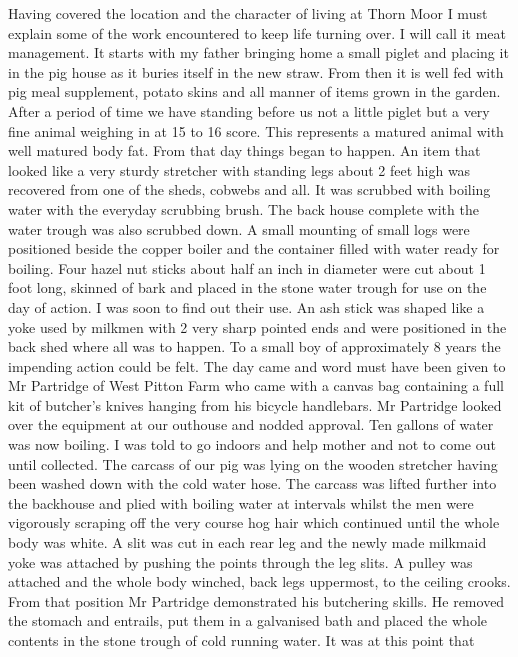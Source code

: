 
Having covered the location and the character of living at Thorn Moor I must
explain some of the work encountered to keep life turning over. I will call it
meat management. It starts with my father bringing home a small piglet and
placing it in the pig house as it buries itself in the new straw. From then it
is well fed with pig meal supplement, potato skins and all manner of items
grown in the garden. After a period of time we have standing before us not a
little piglet but a very fine animal weighing in at 15 to 16 score. This
represents a matured animal with well matured body fat. From that day things
began to happen. An item that looked like a very sturdy stretcher with
standing legs about 2 feet high was recovered from one of the sheds, cobwebs
and all. It was scrubbed with boiling water with the everyday scrubbing brush.
The back house complete with the water trough was also scrubbed down. A small
mounting of small logs were positioned beside the copper boiler and the
container filled with water ready for boiling. Four hazel nut sticks about
half an inch in diameter were cut about 1 foot long, skinned of bark and placed
in the stone water trough for use on the day of action. I was soon to find out
their use. An ash stick was shaped like a yoke used by milkmen with 2 very
sharp pointed ends and were positioned in the back shed where all was to
happen. To a small boy of approximately 8 years the impending action could be
felt. The day came and word must have been given to Mr Partridge of West Pitton
Farm who came with a canvas bag containing a full kit of butcher's knives
hanging from his bicycle handlebars. Mr Partridge looked over the equipment at
our outhouse and nodded approval. Ten gallons of water was now boiling. I was
told to go indoors and help mother and not to come out until collected. The
carcass of our pig was lying on the wooden stretcher having been washed down
with the cold water hose. The carcass was lifted further into the backhouse
and plied with boiling water at intervals whilst the men were vigorously
scraping off the very course hog hair which continued until the whole body was
white. A slit was cut in each rear leg and the newly made milkmaid yoke was
attached by pushing the points through the leg slits. A pulley was attached
and the whole body winched, back legs uppermost, to the ceiling crooks. From
that position Mr Partridge demonstrated his butchering skills. He removed the
stomach and entrails, put them in a galvanised bath and placed the whole
contents in the stone trough of cold running water. It was at this point that
